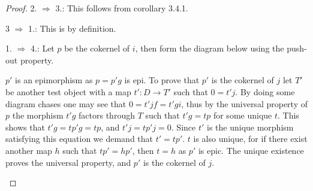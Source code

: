 \begin{proof}
        2. $\Rightarrow$ 3.: This follows from corollary 3.4.1.
        
        3 $\Rightarrow$ 1.: This is by definition.

        1. $\Rightarrow$ 4.: Let $p$ be the cokernel of $i$, then form the diagram below using the push-out property.
        \begin{center}
        \end{center}
        $p'$ is an epimorphism as $p=p'g$ is epi. To prove that $p'$ is the cokernel of $j$ let $T'$ be another test object with a map $t':D\rightarrow T'$ such that $0 = t'j$. By doing some diagram chases one may see that $0=t'jf=t'gi$, thus by the universal property of $p$ the morphism $t'g$ factors through $T$ such that $t'g=tp$ for some unique $t$. This shows that $t'g=tp'g=tp$, and $t'j=tp'j=0$. Since $t'$ is the unique morphism satisfying this equation we demand that $t'=tp'$. $t$ is also unique, for if there exist another map $h$ such that $tp'=hp'$, then $t=h$ as $p'$ is epic. The unique existence proves the universal property, and $p'$ is the cokernel of $j$.
        \begin{center}
        \end{center}
 

\end{proof}
